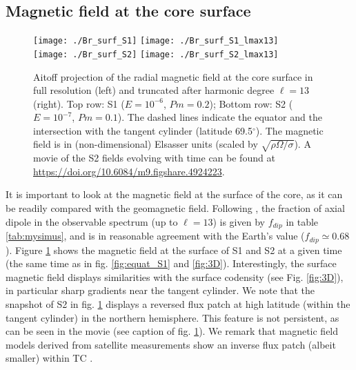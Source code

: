 \documentclass[12pt, a4paper]{article}
\begin{document}
\subsection{Magnetic field at the core surface}		\label{sec:br_surf}

\begin{figure}
\centering
\texttt{[image: ./Br\_surf\_S1]}
\texttt{[image: ./Br\_surf\_S1\_lmax13]} \\[1em]
\texttt{[image: ./Br\_surf\_S2]}
\texttt{[image: ./Br\_surf\_S2\_lmax13]}

\caption{Aitoff projection of the radial magnetic field at the core surface in full resolution (left) and truncated after harmonic degree $\ell=13$ (right).
Top row: S1 ($E=10^{-6}$, $Pm=0.2$); Bottom row: S2 ($E=10^{-7}$, $Pm=0.1$).
The dashed lines indicate the equator and the intersection with the tangent cylinder (latitude 69.5$^\circ$).
The magnetic field is in (non-dimensional) Elsasser units (scaled by $\sqrt{\rho\Omega/\sigma}$).
A movie of the S2 fields evolving with time can be found at \url{https://doi.org/10.6084/m9.figshare.4924223}.
}
\label{fig:Br}
\end{figure}

It is important to look at the magnetic field at the surface of the core, as it can be readily compared with the geomagnetic field.
Following \citep{christensen2006}, the fraction of axial dipole in the observable spectrum (up to $\ell=13$) is given by $f_{dip}$ in table \ref{tab:mysimus}, and is in reasonable agreement with the Earth's value ($f_{dip} \simeq 0.68$).
Figure \ref{fig:Br} shows the magnetic field at the surface of S1 and S2 at a given time (the same time as in fig. \ref{fig:equat_S1} and \ref{fig:3D}).
Interestingly, the surface magnetic field displays similarities with the surface codensity (see Fig. \ref{fig:3D}), in particular sharp gradients near the tangent cylinder.
We note that the snapshot of S2 in fig. \ref{fig:Br} displays a reversed flux patch at high latitude (within the tangent cylinder) in the northern hemisphere. This feature is not persistent, as can be seen in the movie (see caption of fig. \ref{fig:Br}).
We remark that magnetic field models derived from satellite measurements show an inverse flux patch (albeit smaller) within TC \citep[see e.g.][fig.~25]{hulot2015}.
\end{document}

